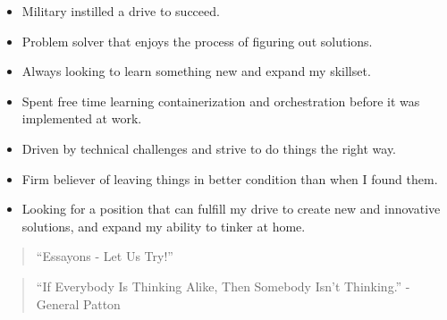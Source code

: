 \documentclass[10pt,a4paper,ragged2e,withhyper]{altacv}
\begin{document}
\begin{paracol}{2}
\medskip


\begin{itemize}
\item Military instilled a drive to succeed. 
\item Problem solver that enjoys the process of figuring out solutions. 
\item Always looking to learn something new and expand my skillset.
\item Spent free time learning containerization and orchestration before it was implemented at work.
\item Driven by technical challenges and strive to do things the right way. 
\item Firm believer of leaving things in better condition than when I found them. 
\item Looking for a position that can fulfill my drive to create new and innovative solutions, and expand my ability to tinker at home.
\end{itemize}

\switchcolumn


\begin{quote}
  ``Essayons - Let Us Try!''
  \end{quote}  

  \divider

\begin{quote}
``If Everybody Is Thinking Alike, Then Somebody Isn't Thinking.'' - General Patton
\end{quote}



\divider



\\

\divider\smallskip



\end{paracol}
\end{document}

